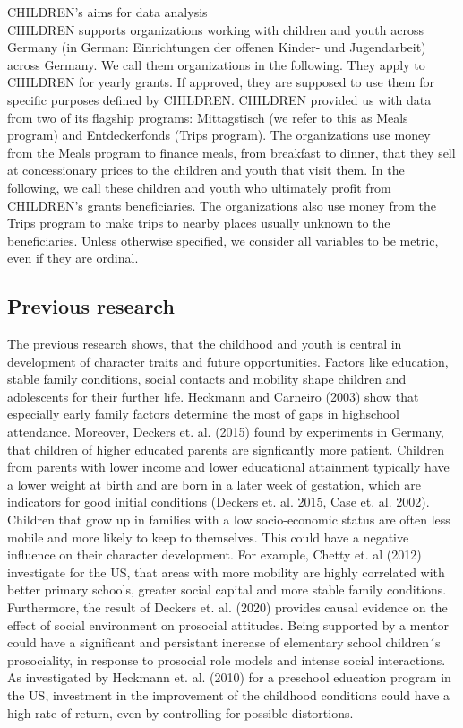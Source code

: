 \documentclass[12pt, a4paper, titlepage]{article}\usepackage[]{graphicx}\usepackage[]{color}
\begin{document}
CHILDREN's aims for data analysis\\ 
CHILDREN supports organizations working with children and youth across Germany (in German: Einrichtungen der offenen Kinder- und Jugendarbeit) across Germany. We call them organizations in the following. They apply to CHILDREN for yearly grants. If approved, they are supposed to use them for specific purposes defined by CHILDREN. CHILDREN provided us with data from two of its flagship programs: Mittagstisch (we refer to this as Meals program) and Entdeckerfonds (Trips program). The organizations use money from the Meals program to finance meals, from breakfast to dinner, that they sell at concessionary prices to the children and youth that visit them. In the following, we call these children and youth who ultimately profit from CHILDREN's grants beneficiaries. The organizations also use money from the Trips program to make trips to nearby places usually unknown to the beneficiaries.  
Unless otherwise specified, we consider all variables to be metric, even if they are ordinal. 

\subsection{Previous research}

The previous research shows, that the childhood and youth is central in development of character traits and future opportunities. Factors like education, stable family conditions, social contacts and mobility shape children and adolescents for their further life. Heckmann and Carneiro (2003) show that especially early family factors determine the most of gaps in highschool attendance. Moreover, Deckers et. al. (2015) found by experiments in Germany, that children of higher educated parents are signficantly more patient. Children from parents with lower income and lower educational attainment typically have a lower weight at birth and are born in a later week of gestation, which are indicators for good initial conditions (Deckers et. al. 2015, Case et. al. 2002). Children that grow up in families with a low socio-economic status are often less mobile and more likely to keep to themselves. This could have a negative influence on their character development. For example, Chetty et. al (2012) investigate for the US, that areas with more mobility are highly correlated with better primary schools, greater social capital and more stable family conditions. Furthermore, the result of Deckers et. al. (2020) provides causal evidence on the effect of social environment on prosocial attitudes. Being supported by a mentor could have a significant and persistant increase of elementary school children´s prosociality, in response to prosocial role models and intense social interactions. As investigated by Heckmann et. al. (2010) for a preschool education program in the US, investment in the improvement of the childhood conditions could have a high rate of return, even by controlling for possible distortions.  
\end{document}
